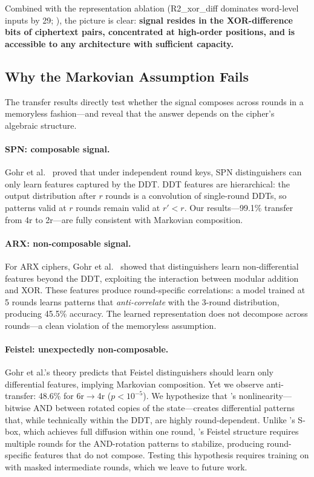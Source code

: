 Combined with the representation ablation (R2\_xor\_diff dominates word-level inputs by 29\pp; ), the picture is clear:
\textbf{signal resides in the XOR-difference bits of ciphertext pairs, concentrated at high-order positions, and is accessible to any architecture with sufficient capacity.}

\FloatBarrier
\subsection{Why the Markovian Assumption Fails}
\label{sec:discussion-compositionality}

The transfer results directly test whether the signal composes across rounds in a memoryless fashion---and reveal that the answer depends on the cipher's algebraic structure.

\paragraph{SPN: composable signal.}
Gohr et al.~\citep{gohr2022assessment} proved that under independent round keys, SPN distinguishers can only learn features captured by the DDT.
DDT features are hierarchical: the output distribution after $r$ rounds is a convolution of single-round DDTs, so patterns valid at $r$ rounds remain valid at $r' < r$.
Our \present results---99.1\% transfer from 4r to 2r---are fully consistent with Markovian composition.

\paragraph{ARX: non-composable signal.}
For ARX ciphers, Gohr et al.~\citep{gohr2022assessment} showed that distinguishers learn non-differential features beyond the DDT, exploiting the interaction between modular addition and XOR.
These features produce round-specific correlations: a model trained at 5 rounds learns patterns that \emph{anti-correlate} with the 3-round distribution, producing 45.5\% accuracy.
The learned representation does not decompose across rounds---a clean violation of the memoryless assumption.

\paragraph{Feistel: unexpectedly non-composable.}
Gohr et al.'s theory predicts that Feistel distinguishers should learn only differential features, implying Markovian composition.
Yet we observe anti-transfer: 48.6\% for \simon 6r$\to$4r ($p < 10^{-5}$).
We hypothesize that \simon's nonlinearity---bitwise AND between rotated copies of the state---creates differential patterns that, while technically within the DDT, are highly round-dependent.
Unlike \present's S-box, which achieves full diffusion within one round, \simon's Feistel structure requires multiple rounds for the AND-rotation patterns to stabilize, producing round-specific features that do not compose.
Testing this hypothesis requires training on \simon with masked intermediate rounds, which we leave to future work.

